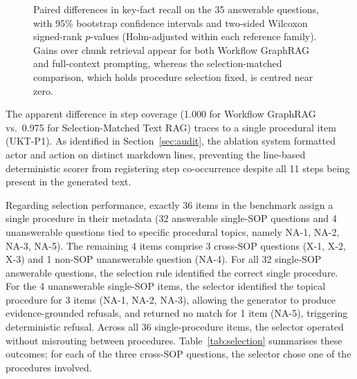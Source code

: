 \documentclass[preprint,10pt]{elsarticle}
\begin{document}
\begin{figure}[!htbp]
\caption{Paired differences in key-fact recall on the 35 answerable questions, with 95\% bootstrap confidence intervals and two-sided Wilcoxon signed-rank $p$-values (Holm-adjusted within each reference family). Gains over chunk retrieval appear for both Workflow GraphRAG and full-context prompting, whereas the selection-matched comparison, which holds procedure selection fixed, is centred near zero.}
\label{fig:forest}
\end{figure}

The apparent difference in step coverage (1.000 for Workflow GraphRAG vs.\ 0.975 for Selection-Matched Text RAG) traces to a single procedural item (UKT-P1). As identified in Section~\ref{sec:audit}, the ablation system formatted actor and action on distinct markdown lines, preventing the line-based deterministic scorer from registering step co-occurrence despite all 11 steps being present in the generated text.

Regarding selection performance, exactly 36 items in the benchmark assign a single procedure in their metadata (32 answerable single-SOP questions and 4 unanswerable questions tied to specific procedural topics, namely NA-1, NA-2, NA-3, NA-5). The remaining 4 items comprise 3 cross-SOP questions (X-1, X-2, X-3) and 1 non-SOP unanswerable question (NA-4). For all 32 single-SOP answerable questions, the selection rule identified the correct single procedure. For the 4 unanswerable single-SOP items, the selector identified the topical procedure for 3 items (NA-1, NA-2, NA-3), allowing the generator to produce evidence-grounded refusals, and returned no match for 1 item (NA-5), triggering deterministic refusal. Across all 36 single-procedure items, the selector operated without misrouting between procedures. Table~\ref{tab:selection} summarises these outcomes; for each of the three cross-SOP questions, the selector chose one of the procedures involved.
\end{document}

